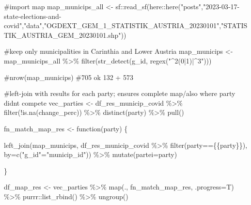 \documentclass[
  letterpaper,
  DIV=11,
  numbers=noendperiod,
  oneside]{scrartcl}
\newenvironment{Shaded}{\begin{snugshade}}{\end{snugshade}}
\newcommand{\AttributeTok}[1]{\textcolor[rgb]{0.40,0.45,0.13}{#1}}
\newcommand{\CommentTok}[1]{\textcolor[rgb]{0.37,0.37,0.37}{#1}}
\newcommand{\ControlFlowTok}[1]{\textcolor[rgb]{0.00,0.23,0.31}{#1}}
\newcommand{\FunctionTok}[1]{\textcolor[rgb]{0.28,0.35,0.67}{#1}}
\newcommand{\NormalTok}[1]{\textcolor[rgb]{0.00,0.23,0.31}{#1}}
\newcommand{\OtherTok}[1]{\textcolor[rgb]{0.00,0.23,0.31}{#1}}
\newcommand{\SpecialCharTok}[1]{\textcolor[rgb]{0.37,0.37,0.37}{#1}}
\newcommand{\StringTok}[1]{\textcolor[rgb]{0.13,0.47,0.30}{#1}}
\begin{document}
\begin{Shaded}
\begin{Highlighting}[]
\CommentTok{\#import map}
\NormalTok{map\_municips\_all }\OtherTok{\textless{}{-}}\NormalTok{ sf}\SpecialCharTok{::}\FunctionTok{read\_sf}\NormalTok{(here}\SpecialCharTok{::}\FunctionTok{here}\NormalTok{(}\StringTok{"posts"}\NormalTok{,}\StringTok{"2023{-}03{-}17{-}state{-}elections{-}and{-}covid"}\NormalTok{,}\StringTok{"data"}\NormalTok{,}\StringTok{"OGDEXT\_GEM\_1\_STATISTIK\_AUSTRIA\_20230101"}\NormalTok{,}\StringTok{"STATISTIK\_AUSTRIA\_GEM\_20230101.shp"}\NormalTok{))}

\CommentTok{\#keep only municipalities in Carinthia and Lower Austria}
\NormalTok{map\_municips }\OtherTok{\textless{}{-}}\NormalTok{ map\_municips\_all }\SpecialCharTok{\%\textgreater{}\%} \FunctionTok{filter}\NormalTok{(}\FunctionTok{str\_detect}\NormalTok{(g\_id, }\FunctionTok{regex}\NormalTok{(}\StringTok{"\^{}2(0|1)|\^{}3"}\NormalTok{)))}

\CommentTok{\#nrow(map\_municips) \#705 ok 132 + 573}

\CommentTok{\#left{-}join with results for each party; ensures complete map/also where party didn\textquotesingle{}t compete}
\NormalTok{vec\_parties }\OtherTok{\textless{}{-}}\NormalTok{ df\_res\_municip\_covid }\SpecialCharTok{\%\textgreater{}\%} 
  \FunctionTok{filter}\NormalTok{(}\SpecialCharTok{!}\FunctionTok{is.na}\NormalTok{(change\_perc)) }\SpecialCharTok{\%\textgreater{}\%} 
  \FunctionTok{distinct}\NormalTok{(party) }\SpecialCharTok{\%\textgreater{}\%} 
  \FunctionTok{pull}\NormalTok{()}

\NormalTok{fn\_match\_map\_res }\OtherTok{\textless{}{-}} \ControlFlowTok{function}\NormalTok{(party) \{}
  
\FunctionTok{left\_join}\NormalTok{(map\_municips,}
\NormalTok{          df\_res\_municip\_covid }\SpecialCharTok{\%\textgreater{}\%} \FunctionTok{filter}\NormalTok{(party}\SpecialCharTok{==}\NormalTok{\{\{party\}\}),}
          \AttributeTok{by=}\FunctionTok{c}\NormalTok{(}\StringTok{"g\_id"}\OtherTok{=}\StringTok{"municip\_id"}\NormalTok{)) }\SpecialCharTok{\%\textgreater{}\%} 
    \FunctionTok{mutate}\NormalTok{(}\AttributeTok{partei=}\NormalTok{party)}

\NormalTok{  \}}

\NormalTok{df\_map\_res }\OtherTok{\textless{}{-}}\NormalTok{ vec\_parties }\SpecialCharTok{\%\textgreater{}\%} \FunctionTok{map}\NormalTok{(., fn\_match\_map\_res, }\AttributeTok{.progress=}\NormalTok{T) }\SpecialCharTok{\%\textgreater{}\%} 
\NormalTok{  purrr}\SpecialCharTok{::}\FunctionTok{list\_rbind}\NormalTok{() }\SpecialCharTok{\%\textgreater{}\%} 
  \FunctionTok{ungroup}\NormalTok{()}
\end{Highlighting}
\end{Shaded}
\end{document}

